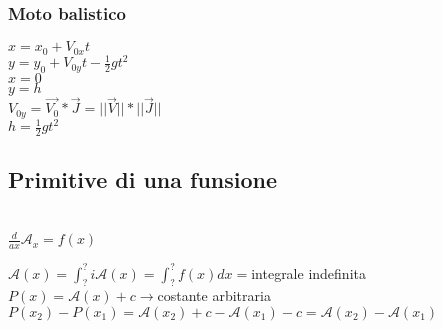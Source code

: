 \documentclass{book}
\begin{document}
\subsubsection{Moto balistico}
$x=x_0+V_{0x}t$\\
$y=y_0+V_{0y}t-\frac{1}{2}gt^2$\\
$x=0$\\
$y=h$\\
$V_{0y}=\overrightarrow{V_0}*\overrightarrow{J}=||\overrightarrow{V}||*||\overrightarrow{J}||$\\
$h=\frac{1}{2}gt^2$

\subsection{Primitive di una funsione}
\\
$\frac{d}{ax}\mathcal{A}_x=f(x)$
\begin{multicols}{2}
$\mathcal{A}(x)=\int^?_? i\mathcal{A}(x)=\int^?_? f(x)dx=$integrale indefinita\\
$P(x)=\mathcal{A}(x)+c\to$costante arbitraria\\
$P(x_2)-P(x_1)=\mathcal{A}(x_2)+c-\mathcal{A}(x_1)-c=\mathcal{A}(x_2)-\mathcal{A}(x_1)$\\
\end{multicols}
\end{document}
